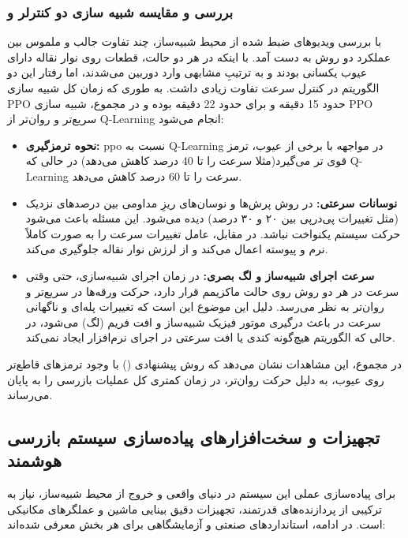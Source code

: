\documentclass[a4paper, 10pt, twocolumn]{article}
\begin{document}
	\subsubsection*{بررسی و مقایسه شبیه سازی دو کنترلر  و }
	
	با بررسی ویدیوهای ضبط شده از محیط شبیه‌ساز، چند تفاوت جالب و ملموس بین عملکرد دو روش به دست آمد. با اینکه در هر دو حالت، قطعات روی نوار نقاله دارای عیوب یکسانی بودند و به ترتیبِ مشابهی وارد دوربین می‌شدند، اما رفتار این دو الگوریتم در کنترل سرعت تفاوت زیادی داشت. به طوری که زمان کل شبیه سازی PPO حدود 15 دقیقه و برای  حدود 22 دقیقه بوده و در مجموع، شبیه سازی PPO سریع‌تر و روان‌تر از Q-Learning انجام می‌شود:
	
	\begin{itemize}
		\item \textbf{نحوه ترمزگیری:} ppo نسبت به Q-Learning در مواجهه با برخی از عیوب، ترمز قوی تر می‌گیرد(مثلا سرعت را تا 40 درصد کاهش می‌دهد) در حالی که Q-Learning سرعت را تا 60 درصد کاهش می‌دهد.
		
		\item \textbf{نوسانات سرعتی:} در روش  پرش‌ها و نوسان‌های ریزِ مداومی بین درصدهای نزدیک (مثل تغییرات پی‌درپی بین ۲۰ و ۳۰ درصد) دیده می‌شود. این مسئله باعث می‌شود حرکت سیستم یکنواخت نباشد. در مقابل، عامل  تغییرات سرعت را به صورت کاملاً نرم و پیوسته اعمال می‌کند و از لرزش نوار نقاله جلوگیری می‌کند.
		
		\item \textbf{سرعت اجرای شبیه‌ساز و لگ بصری:} در زمان اجرای شبیه‌سازی، حتی وقتی سرعت در هر دو روش روی حالت ماکزیمم قرار دارد، حرکت ورقه‌ها در  سریع‌تر و روان‌تر به نظر می‌رسد. دلیل این موضوع این است که تغییرات پله‌ای و ناگهانی سرعت در  باعث درگیری موتور فیزیک شبیه‌ساز و افت فریم (لگ) می‌شود، در حالی که الگوریتم  هیچ‌گونه کندی یا افت سرعتی در اجرای نرم‌افزار ایجاد نمی‌کند.
	\end{itemize}
	
	در مجموع، این مشاهدات نشان می‌دهد که روش پیشنهادی () با وجود ترمزهای قاطع‌تر روی عیوب، به دلیل حرکت روان‌تر، در زمان کمتری کل عملیات بازرسی را به پایان می‌رساند.
	
	\subsection{تجهیزات و سخت‌افزارهای پیاده‌سازی سیستم بازرسی هوشمند}
	
	برای پیاده‌سازی عملی این سیستم در دنیای واقعی و خروج از محیط شبیه‌ساز، نیاز به ترکیبی از پردازنده‌های قدرتمند، تجهیزات دقیق بینایی ماشین و عملگرهای مکانیکی است. در ادامه، استانداردهای صنعتی و آزمایشگاهی برای هر بخش معرفی شده‌اند:
	
\end{document}
